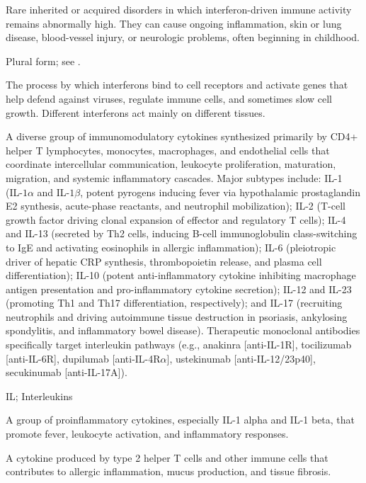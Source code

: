  Rare inherited or acquired disorders in which interferon-driven immune activity remains abnormally high. They can cause ongoing inflammation, skin or lung disease, blood-vessel injury, or neurologic problems, often beginning in childhood.

 Plural form; see .

 The process by which interferons bind to cell receptors and activate genes that help defend against viruses, regulate immune cells, and sometimes slow cell growth. Different interferons act mainly on different tissues.

 A diverse group of immunomodulatory cytokines synthesized primarily by CD4+ helper T lymphocytes, monocytes, macrophages, and endothelial cells that coordinate intercellular communication, leukocyte proliferation, maturation, migration, and systemic inflammatory cascades. Major subtypes include: IL-1 (IL-$1\alpha$ and IL-$1\beta$, potent pyrogens inducing fever via hypothalamic prostaglandin E2 synthesis, acute-phase reactants, and neutrophil mobilization); IL-2 (T-cell growth factor driving clonal expansion of effector and regulatory T cells); IL-4 and IL-13 (secreted by Th2 cells, inducing B-cell immunoglobulin class-switching to IgE and activating eosinophils in allergic inflammation); IL-6 (pleiotropic driver of hepatic CRP synthesis, thrombopoietin release, and plasma cell differentiation); IL-10 (potent anti-inflammatory cytokine inhibiting macrophage antigen presentation and pro-inflammatory cytokine secretion); IL-12 and IL-23 (promoting Th1 and Th17 differentiation, respectively); and IL-17 (recruiting neutrophils and driving autoimmune tissue destruction in psoriasis, ankylosing spondylitis, and inflammatory bowel disease). Therapeutic monoclonal antibodies specifically target interleukin pathways (e.g., anakinra [anti-IL-1R], tocilizumab [anti-IL-6R], dupilumab [anti-IL-4R$\alpha$], ustekinumab [anti-IL-12/23p40], secukinumab [anti-IL-17A]).

\synonyms
IL; Interleukins

 A group of proinflammatory cytokines, especially IL-1 alpha and IL-1 beta, that promote fever, leukocyte activation, and inflammatory responses.

 A cytokine produced by type 2 helper T cells and other immune cells that contributes to allergic inflammation, mucus production, and tissue fibrosis.

